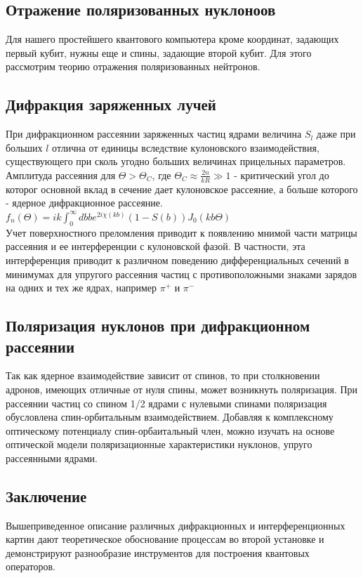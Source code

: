 \documentclass[11pt]{report}
\begin{document}
\subsection{Отражение поляризованных нуклоноов}
Для нашего простейшего квантового компьютера кроме координат, задающих первый кубит, нужны еще и спины, задающие второй кубит. Для этого рассмотрим теорию отражения поляризованных нейтронов.


\subsection{Дифракция заряженных лучей}
При дифракционном рассеянии заряженных частиц ядрами величина $S_l$ даже при больших $l$ отлична от единицы вследствие кулоновского взаимодействия, существующего при сколь угодно больших величинах прицельных параметров. \\

Амплитуда рассеяния для $\Theta > \Theta_C$, где $\Theta_C \approx \frac{2n}{kR} \gg 1$ - критический угол до которог основной вклад в сечение дает кулоновское рассеяние, а больше которого - ядерное дифракционное рассеяние. \\

$f_n(\Theta) = ik \int_0^∞ dbbe^{2i\chi (kb)}(1-S(b))J_0(kb\Theta)$ \\

Учет поверхностного преломления приводит к появлению мнимой части матрицы рассеяния и ее интерференции с кулоновской фазой. В частности, эта интерференция приводит к различном поведению дифференциальных сечений в минимумах для упругого рассеяния частиц с противоположными знаками зарядов на одних и тех же ядрах, например $\pi^{+} $ и $\pi^{-} $ 

\subsection{Поляризация нуклонов при дифракционном рассеянии}
Так как ядерное взаимодействие зависит от спинов, то при столкновении адронов, имеющих отличные от нуля спины, может возникнуть поляризация. При рассеянии частиц со спином 1/2 ядрами с нулевыми спинами поляризация обусловлена спин-орбитальным взаимодействием. Добавляя к комплексному оптическому потенциалу спин-орбаитальный член, можно изучать на основе оптической модели поляризационные характеристики нуклонов, упруго рассеянными ядрами. 

\subsection{Заключение}
Вышеприведенное описание различных дифракционных и интерференционных картин дают теоретическое обоснование процессам во второй установке и демонстрируют разнообразие инструментов для построения квантовых операторов.
\end{document}
